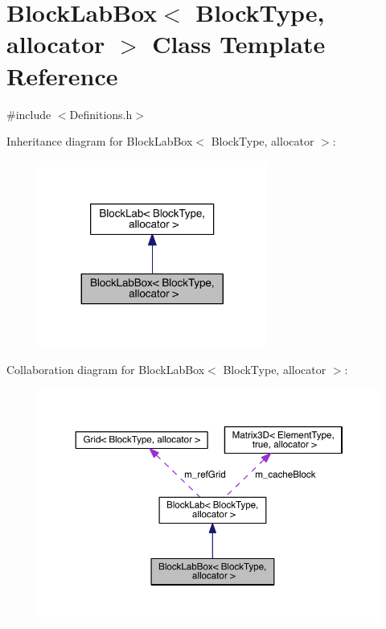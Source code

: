 \hypertarget{class_block_lab_box}{}\section{Block\+Lab\+Box$<$ Block\+Type, allocator $>$ Class Template Reference}
\label{class_block_lab_box}


{\ttfamily \#include $<$Definitions.\+h$>$}



Inheritance diagram for Block\+Lab\+Box$<$ Block\+Type, allocator $>$\+:\nopagebreak
\begin{figure}[H]
\begin{center}
\leavevmode
\includegraphics[width=212pt]{d8/d35/class_block_lab_box__inherit__graph}
\end{center}
\end{figure}


Collaboration diagram for Block\+Lab\+Box$<$ Block\+Type, allocator $>$\+:\nopagebreak
\begin{figure}[H]
\begin{center}
\leavevmode
\includegraphics[width=350pt]{d0/d61/class_block_lab_box__coll__graph}
\end{center}
\end{figure}
